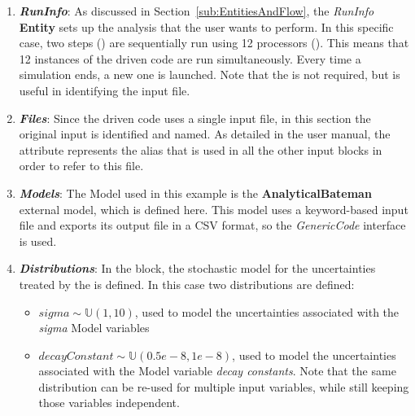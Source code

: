 \begin{enumerate}
   \item \textbf{\textit{RunInfo}}:
     As discussed in Section~\ref{sub:EntitiesAndFlow}, the \textit{RunInfo} \textbf{Entity} sets up the analysis
     that the user wants to perform. In this specific case, two steps () are sequentially run
     using 12 processors (). This means that
     12 instances of the driven code are run simultaneously. Every time a simulation ends, a new one is launched.
     Note that the  is not required, but is useful in identifying the input file.
   \item \textbf{\textit{Files}}:
     Since the driven code uses a single input file, in this section the original input is identified and
     named. As detailed in the user manual, the attribute  represents the alias that is used in
     all the other input blocks in order to refer to this file.
   \item \textbf{\textit{Models}}:
     The Model used in this example is the
     \textbf{AnalyticalBateman} external model, which is defined here.  This model uses a keyword-based input file
     and exports its output file in a CSV format, so the \textit{GenericCode} interface is used.
   \item \textbf{\textit{Distributions}}:
     In the  block, the stochastic model for the uncertainties treated by the
      is defined. In this case two distributions are defined:
     \begin{itemize}
      \item $sigma \sim \mathbb{U}(1,10)$, used to model the uncertainties
        associated with the \textit{sigma} Model variables
      \item  $decayConstant \sim \mathbb{U}(0.5e-8,1e-8)$,  used to
        model the uncertainties associated with the Model variable \textit{decay constants}.  Note that the
        same distribution can be re-used for multiple input variables, while still keeping those variables
        independent.
     \end{itemize}

\end{enumerate}
